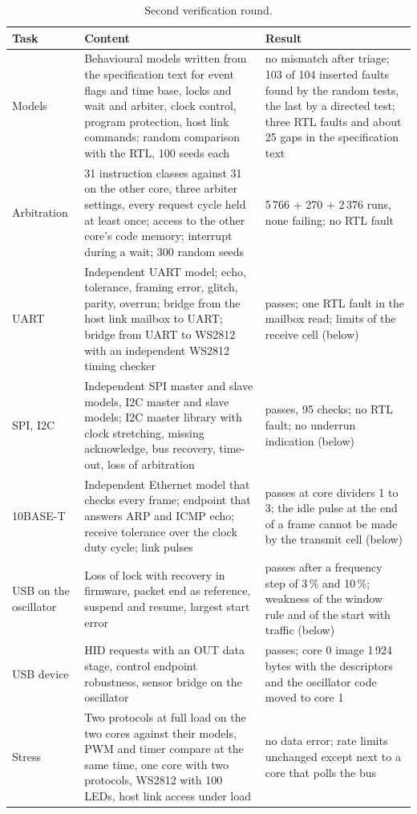 \documentclass[10pt,a4paper]{article}
\begin{document}
\begin{table}[H]
\centering\small
\begin{tabularx}{\linewidth}{@{}lLL@{}}
\toprule
Task & Content & Result \\
\midrule
Models & Behavioural models written from the specification text for event flags and time base, locks and wait and arbiter, clock control, program protection, host link commands; random comparison with the RTL, 100 seeds each & no mismatch after triage; 103 of 104 inserted faults found by the random tests, the last by a directed test; three RTL faults and about 25 gaps in the specification text \\
Arbitration & 31 instruction classes against 31 on the other core, three arbiter settings, every request cycle held at least once; access to the other core's code memory; interrupt during a wait; 300 random seeds & 5\,766 + 270 + 2\,376 runs, none failing; no RTL fault \\
UART & Independent UART model; echo, tolerance, framing error, glitch, parity, overrun; bridge from the host link mailbox to UART; bridge from UART to WS2812 with an independent WS2812 timing checker & passes; one RTL fault in the mailbox read; limits of the receive cell (below) \\
SPI, I2C & Independent SPI master and slave models, I2C master and slave models; I2C master library with clock stretching, missing acknowledge, bus recovery, time-out, loss of arbitration & passes, 95 checks; no RTL fault; no underrun indication (below) \\
10BASE-T & Independent Ethernet model that checks every frame; endpoint that answers ARP and ICMP echo; receive tolerance over the clock duty cycle; link pulses & passes at core dividers 1 to 3; the idle pulse at the end of a frame cannot be made by the transmit cell (below) \\
USB on the oscillator & Loss of lock with recovery in firmware, packet end as reference, suspend and resume, largest start error & passes after a frequency step of 3\,\% and 10\,\%; weakness of the window rule and of the start with traffic (below) \\
USB device & HID requests with an OUT data stage, control endpoint robustness, sensor bridge on the oscillator & passes; core 0 image 1\,924 bytes with the descriptors and the oscillator code moved to core 1 \\
Stress & Two protocols at full load on the two cores against their models, PWM and timer compare at the same time, one core with two protocols, WS2812 with 100 LEDs, host link access under load & no data error; rate limits unchanged except next to a core that polls the bus \\
\bottomrule
\end{tabularx}
\caption{Second verification round.}
\end{table}
\end{document}
